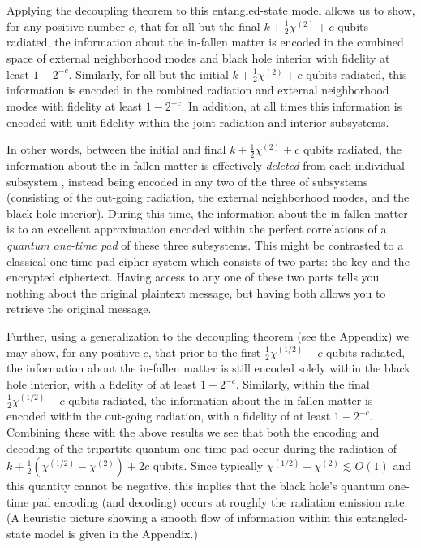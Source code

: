 \documentclass[aps,12pt]{revtex4}
\begin{document}
Applying the decoupling theorem \cite{Abey06} to this entangled-state
model allows us to show, for any positive number $c$, that for all
but the final $k+\frac{1}{2}\chi^{(2)}+c$ qubits radiated, the
information about the in-fallen matter is encoded in the combined space
of external neighborhood modes and black hole interior with fidelity
at least $1-2^{-c}$. Similarly, for all but the initial
$k+\frac{1}{2}\chi^{(2)}+c$ qubits radiated, this information is encoded
in the combined radiation and external neighborhood modes with fidelity
at least $1-2^{-c}$.  In addition, at all times this information is
encoded with unit fidelity within the joint radiation and interior subsystems.

In other words, between the initial and final $k+\frac{1}{2}\chi^{(2)}+c$
qubits radiated, the information about the in-fallen matter is effectively
{\it deleted\/} from each individual subsystem \cite{me,Kretschmann},
instead being encoded in any two of the three of subsystems (consisting of
the out-going radiation, the external neighborhood modes, and the black hole
interior). During this time, the information about the in-fallen matter
is to an excellent approximation encoded within the perfect correlations
of a {\it quantum one-time pad} \cite{me,Leung02} of these three subsystems.
This might be contrasted to a classical one-time pad cipher system
which consists of two parts: the key and the encrypted ciphertext.
Having access to any one of these two parts tells you nothing about
the original plaintext message, but having both allows you to retrieve
the original message.

Further, using a generalization to the decoupling theorem (see
the Appendix) we may show, for any positive $c$, that
prior to the first $\frac{1}{2}\chi^{(1/2)} -c$ qubits radiated,
the information about the in-fallen matter is still encoded solely
within the black hole interior, with a fidelity of at least
$1-2^{-c}$. Similarly, within the final $\frac{1}{2}\chi^{(1/2)} -c$
qubits radiated, the information about the in-fallen matter is encoded
within the out-going radiation, with a fidelity of at least
$1-2^{-c}$. Combining these with the above results we see that both
the encoding and decoding of the tripartite quantum one-time pad
occur during the radiation of
$k+\frac{1}{2}(\chi^{(1/2)}-\chi^{(2)}) + 2c$ qubits. Since
typically $ \chi^{(1/2)}-\chi^{(2)} \lesssim O(1)$ and this quantity
cannot be negative, this implies that the black hole's quantum one-time
pad encoding (and decoding) occurs at roughly the radiation emission rate.
(A heuristic picture showing a smooth flow of information within this
entangled-state model is given in the Appendix.)
\end{document}
